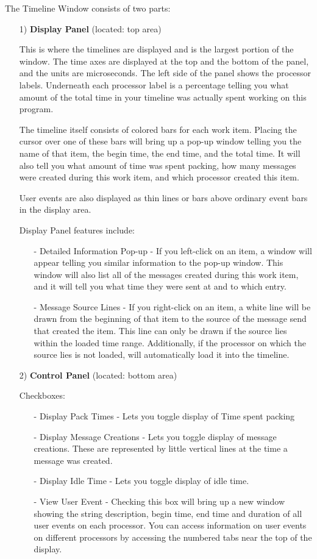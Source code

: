 \documentclass[10pt]{article}
\begin{document}
The Timeline Window consists of two parts:
\begin{enumerate}
\item[1)]
{\bf Display Panel} (located: top area)

This is where the timelines are displayed and is the largest portion
of the window.  The time axes are displayed at the top and the bottom
of the panel, and the units are microseconds.  The left side of the
panel shows the processor labels.  Underneath each processor label is
a percentage telling you what amount of the total time in your
timeline was actually spent working on this program.

The timeline itself consists of colored bars for each work item.
Placing the cursor over one of these bars will bring up a pop-up
window telling you the name of that item, the begin time, the end
time, and the total time.  It will also tell you what amount of time
was spent packing, how many messages were created during this work
item, and which processor created this item. 

User events are also displayed as thin lines or bars above ordinary
event bars in the display area.

Display Panel features include:
   \begin{itemize}
   \item[-] 
   Detailed Information Pop-up - If you left-click on an item, a
   window will appear telling you similar information to the pop-up
   window.  This window will also list all of the messages created
   during this work item, and it will tell you what time they were
   sent at and to which entry.
   \item[-]
   Message Source Lines - If you right-click on an item, a white line
   will be drawn from the beginning of that item to the source of the
   message send that created the item. This line can only be drawn if
   the source lies within the loaded time range. Additionally, if the
   processor on which the source lies is not loaded, \projections{}
   will automatically load it into the timeline.
   \end{itemize}

\item[2)]
{\bf Control Panel} (located: bottom area)

Checkboxes:
   \begin{itemize}
   \item[-]
   Display Pack Times - Lets you toggle display of Time spent packing
   \item[-] 
   Display Message Creations - Lets you toggle display of message
   creations. These are represented by little vertical lines at the
   time a message was created.
   \item[-]
   Display Idle Time - Lets you toggle display of idle time.
   \item[-] 
   View User Event - Checking this box will bring up a new
   window showing the string description, begin time, end time and
   duration of all user events on each processor. You can access
   information on user events on different processors by accessing the
   numbered tabs near the top of the display.


\end{itemize}
\end{enumerate}
\end{document}
